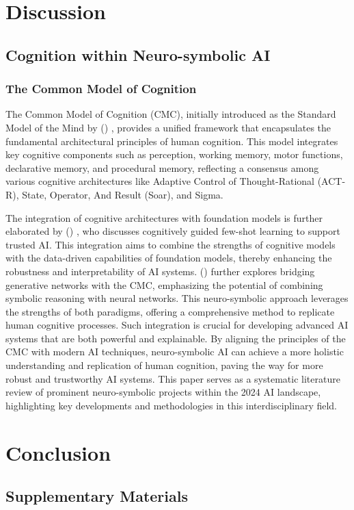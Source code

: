 \documentclass[journal]{IEEEtran}
\newcommand{\citeauthornum}[1]{\citeauthor{#1} (\citeyear{#1}) \cite{#1}}
\begin{document}


\section{Discussion}\label{sec:discussion}

\subsection{Cognition within Neuro-symbolic AI}
\subsubsection{The Common Model of Cognition}
The Common Model of Cognition (CMC), initially introduced as the Standard Model of the Mind by \citeauthornum{Laird2017}, provides a unified framework that encapsulates the fundamental architectural principles of human cognition. This model integrates key cognitive components such as perception, working memory, motor functions, declarative memory, and procedural memory, reflecting a consensus among various cognitive architectures like Adaptive Control of Thought-Rational (ACT-R), State, Operator, And Result (Soar), and Sigma. 

The integration of cognitive architectures with foundation models is further elaborated by \citeauthornum{Thomson2024}, who discusses cognitively guided few-shot learning to support trusted AI. This integration aims to combine the strengths of cognitive models with the data-driven capabilities of foundation models, thereby enhancing the robustness and interpretability of AI systems. \citeauthornum{West2024} further explores bridging generative networks with the CMC, emphasizing the potential of combining symbolic reasoning with neural networks. This neuro-symbolic approach leverages the strengths of both paradigms, offering a comprehensive method to replicate human cognitive processes. Such integration is crucial for developing advanced AI systems that are both powerful and explainable. By aligning the principles of the CMC with modern AI techniques, neuro-symbolic AI can achieve a more holistic understanding and replication of human cognition, paving the way for more robust and trustworthy AI systems. This paper serves as a systematic literature review of prominent neuro-symbolic projects within the 2024 AI landscape, highlighting key developments and methodologies in this interdisciplinary field.


\section{Conclusion}\label{sec:conclusion}

\clearpage
\printbibliography

\onecolumn
\clearpage

\begin{appendices}
\section{Supplementary Materials}

\nomenclature{\(\)}{}

\printnomenclature

\end{appendices}
\end{document}
